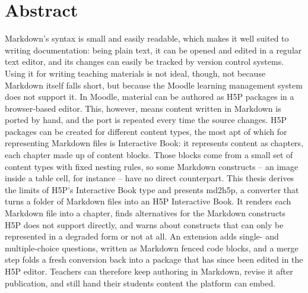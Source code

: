 \section*{Abstract}
\label{sec:abstract}

Markdown's syntax is small and easily readable, which makes it well suited to writing documentation: being plain text, it can be opened and edited in a regular text editor, and its changes can easily be tracked by version control systems.
Using it for writing teaching materials is not ideal, though, not because Markdown itself falls short, but because the Moodle learning management system does not support it.
In Moodle, material can be authored as H5P packages in a browser-based editor.
This, however, means content written in Markdown is ported by hand, and the port is repeated every time the source changes.
H5P packages can be created for different content types, the most apt of which for representing Markdown files is Interactive Book: it represents content as chapters, each chapter made up of content blocks.
Those blocks come from a small set of content types with fixed nesting rules, so some Markdown constructs -- an image inside a table cell, for instance -- have no direct counterpart.
This thesis derives the limits of H5P's Interactive Book type and presents md2h5p, a converter that turns a folder of Markdown files into an H5P Interactive Book.
It renders each Markdown file into a chapter, finds alternatives for the Markdown constructs H5P does not support directly, and warns about constructs that can only be represented in a degraded form or not at all.
An extension adds single- and multiple-choice questions, written as Markdown fenced code blocks, and a
merge step folds a fresh conversion back into a package that has since been edited in the H5P editor.
Teachers can therefore keep authoring in Markdown, revise it after publication, and still
hand their students content the platform can embed.
